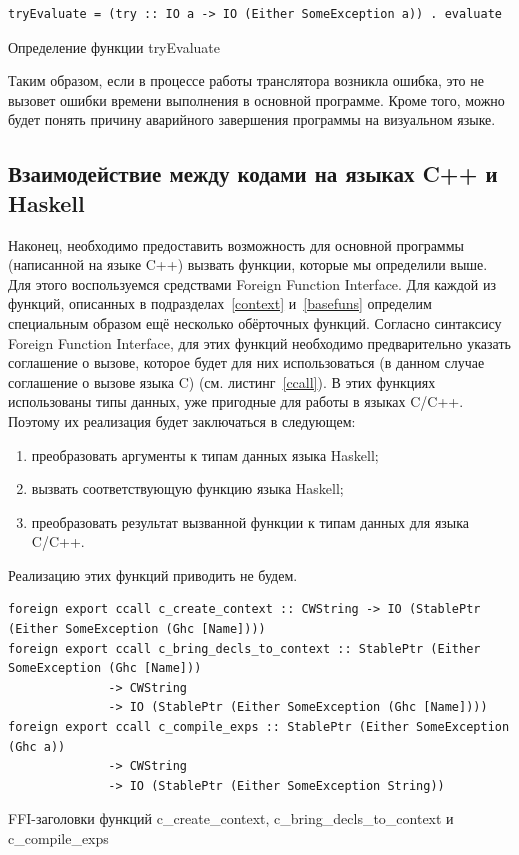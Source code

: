 \begin{ListingEnv}[h]
	\begin{lstlisting}
tryEvaluate = (try :: IO a -> IO (Either SomeException a)) . evaluate
	\end{lstlisting}
	\caption{Определение функции tryEvaluate}\label{tryeval}
\end{ListingEnv}
	
	Таким образом, если в процессе работы транслятора возникла ошибка, это не вызовет ошибки времени выполнения в основной программе. Кроме того, можно будет понять причину аварийного завершения программы на визуальном языке.
	
	\subsection{Взаимодействие между кодами на языках C++ и Haskell}	
	Наконец, необходимо предоставить возможность для основной программы (написанной на языке C++) вызвать функции, которые мы определили выше. Для этого воспользуемся средствами Foreign Function Interface. Для каждой из функций, описанных в подразделах~\ref{context} и~\ref{basefuns} определим специальным образом ещё несколько обёрточных функций. Согласно синтаксису Foreign Function Interface, для этих функций необходимо предварительно указать соглашение о вызове, которое будет для них использоваться (в данном случае соглашение о вызове языка C) (см. листинг~\ref{ccall}). В этих функциях использованы типы данных, уже пригодные для работы в языках C/C++. Поэтому их реализация будет заключаться в следующем:
	\begin{enumerate}[1)]
		\item преобразовать аргументы к типам данных языка Haskell;
		\item вызвать соответствующую функцию языка Haskell;
		\item преобразовать результат вызванной функции к типам данных для языка C/C++.
	\end{enumerate}

	Реализацию этих функций приводить не будем.

\begin{ListingEnv}
	\begin{lstlisting}
foreign export ccall c_create_context :: CWString -> IO (StablePtr (Either SomeException (Ghc [Name])))
foreign export ccall c_bring_decls_to_context :: StablePtr (Either SomeException (Ghc [Name])) 
              -> CWString 
              -> IO (StablePtr (Either SomeException (Ghc [Name])))
foreign export ccall c_compile_exps :: StablePtr (Either SomeException (Ghc a)) 
              -> CWString 
              -> IO (StablePtr (Either SomeException String))
	\end{lstlisting}
	\caption{FFI-заголовки функций c\_create\_context, c\_bring\_decls\_to\_context и c\_compile\_exps}\label{ccall}
\end{ListingEnv}	
	
